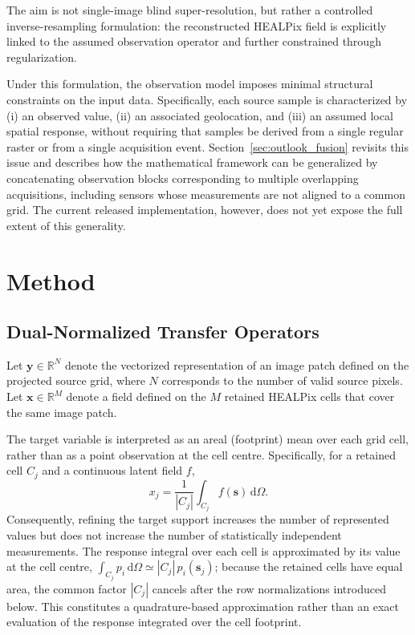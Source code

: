 \documentclass[journal]{IEEEtran}
\newcommand{\healpix}{HEALPix\xspace}
\begin{document}
The aim is not single-image blind super-resolution, but rather a controlled inverse-resampling formulation: the reconstructed \healpix field is explicitly linked to the assumed observation operator and further constrained through regularization.

Under this formulation, the observation model imposes minimal structural constraints on the input data. Specifically, each source sample is characterized by (i) an observed value, (ii) an associated geolocation, and (iii) an assumed local spatial response, without requiring that samples be derived from a single regular raster or from a single acquisition event. Section~\ref{sec:outlook_fusion} revisits this issue and describes how the mathematical framework can be generalized by concatenating observation blocks corresponding to multiple overlapping acquisitions, including sensors whose measurements are not aligned to a common grid. The current released implementation, however, does not yet expose the full extent of this generality.

\section{Method}

\subsection{Dual-Normalized Transfer Operators}
\label{sec:dual_normalized_operators}

Let $\mathbf{y}\in\mathbb{R}^{N}$ denote the vectorized representation of an image patch defined on the projected source grid, where $N$ corresponds to the number of valid source pixels. Let $\mathbf{x}\in\mathbb{R}^{M}$ denote a field defined on the $M$ retained \healpix cells that cover the same image patch.

The target variable is interpreted as an areal (footprint) mean over each grid cell, rather than as a point observation at the cell centre. Specifically, for a retained cell $C_j$ and a continuous latent field $f$,
\begin{equation}
 x_j = \frac{1}{|C_j|}\int_{C_j} f(\boldsymbol{s})\,\mathrm d\Omega.
\label{eq:cell_average}
\end{equation}
Consequently, refining the target support increases the number of represented values but does not increase the number of statistically independent measurements. The response integral over each cell is approximated by its value at the cell centre, $\int_{C_j}p_i\,\mathrm d\Omega\simeq|C_j|\,p_i(\boldsymbol s_j)$; because the retained cells have equal area, the common factor $|C_j|$ cancels after the row normalizations introduced below. This constitutes a quadrature-based approximation rather than an exact evaluation of the response integrated over the cell footprint.
\end{document}
